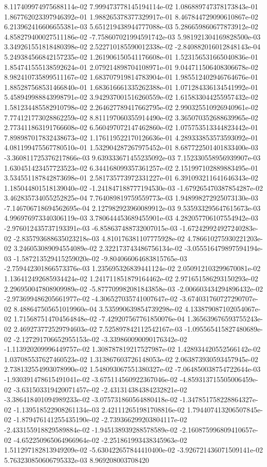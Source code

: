 	8.117409974975688114e-02	7.999473778145194114e-02	1.086889747378173843e-01	1.867762023397946392e-01	1.988265378377329917e-01	8.467844729090610867e-02	6.213962416606655381e-03	5.651219438944777088e-03	5.286659860677873912e-02	4.858279400027511186e-02	-7.758607021994591742e-03	5.981921304169828500e-03	3.349261551818480398e-02	2.522710185590012338e-02	-2.840882016012848143e-04	5.249384566842157235e-02	1.261906150541176608e-01	1.523156531665040836e-01	1.854741555138592624e-01	2.079214898704108971e-01	9.044711506408306678e-02	8.982410735899511167e-02	1.683707919814783904e-01	1.985512402946764676e-01	1.885287568531466840e-01	1.683616661335262388e-01	1.071284336134541992e-01	5.458949988843998791e-02	3.942937001516260559e-02	1.615833044255957432e-02	1.581234485582910798e-02	2.264627789417662795e-02	2.990325510926940961e-02	7.774121773028862259e-02	8.811197060355914490e-02	3.365070352688639965e-02	2.773411863191766608e-02	6.560497072147462860e-02	1.075753513344823442e-01	7.898987017832438673e-02	1.176119522170126636e-01	4.289333853573593092e-01	4.081199475567780510e-01	1.532904287267975452e-01	8.687722501401833400e-03	-3.360811725376217866e-03	9.639333671455235092e-03	7.152330558956939907e-03	1.630451423457723523e-02	6.344168099357361257e-02	2.151997102889883495e-01	3.534551187842873698e-01	2.581735773972331227e-01	6.391093211641646343e-02	1.185044801518139040e-02	-1.241847188777194530e-03	-1.679265470387854287e-02	3.462835734055252825e-04	7.764089819759559773e-03	1.948998272925073130e-03	-7.146706718694562695e-04	2.127982923960089912e-03	9.535933295647615673e-03	4.996976973340306119e-03	3.780644453689455901e-03	4.282057706107554942e-03	-2.976012435737193391e-03	-6.858637488732007015e-03	-1.672429924927240283e-02	-2.835793688635023218e-03	4.810176381107775928e-02	4.786610275930221203e-02	3.246053089094554089e-02	2.322173743486756134e-02	-3.055516479897594194e-03	-1.587213529415259020e-02	-9.804066064683815765e-03	-2.759442301866573376e-03	1.235695326839441124e-02	2.050912103299670081e-02	1.136412492685934424e-02	1.241711851879164462e-02	2.971651586293150293e-02	2.296950047808909989e-02	-5.877709982081843858e-03	-2.006603434294896432e-02	-2.973699486205661977e-02	-4.306527035741007647e-02	-3.674031760727290707e-02	8.488647505651019960e-04	3.535990639854739298e-02	4.133879087102054067e-02	1.715687514704564848e-02	-7.429207567761850076e-04	1.365639676593755243e-02	2.469273772529794603e-02	7.525897842112542167e-03	-1.095565415827480689e-02	-2.127291706652955153e-02	-3.339860090090176342e-02	-1.113920209996449757e-02	1.308787819217527987e-02	1.428934420552566142e-02	1.037085537627460523e-02	1.313867603726148053e-02	2.063873930593457945e-02	2.738132554993078990e-02	1.548093067551380327e-02	-7.064850038754722644e-03	-1.930391478615491041e-02	-3.675114560922367046e-02	-4.859313715505006459e-02	-3.631503319420071457e-02	-2.431314384384232821e-02	-3.386418401094989233e-02	-3.075731860564880418e-02	-1.347851758228864327e-02	-1.139518522908261134e-03	2.421112651981708816e-02	1.794407413206507845e-02	-1.879476141255435190e-02	-2.739366299203804117e-02	-2.433155918829589884e-02	-1.945138939288578589e-02	-2.160875996809410657e-02	-4.652250965064966964e-02	-2.251861993438345963e-02	1.511297182813949209e-02	-5.630422657844410400e-02	-3.926721436071509141e-02	5.763230850606795332e-03	8.969208003708420